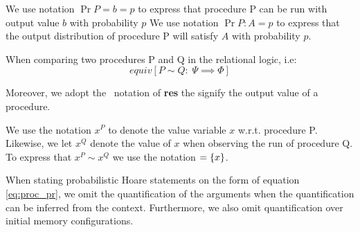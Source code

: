 We use notation $\Pr{P = b} = p$ to express that procedure P can be run with
output value $b$ with probability $p$
We use notation $\Pr{P : A} = p$ to express that the output distribution of
procedure P will satisfy $A$ with probability $p$.

When comparing two procedures P and Q in the relational logic, i.e:
\[
  equiv[P \sim Q :\; \Psi \implies \Phi]
\]

Moreover, we adopt the \easycrypt\ notation of \textbf{res} the signify the
output value of a procedure.

We use the notation $x^{P}$ to denote the value variable $x$ w.r.t. procedure P.
Likewise, we let $x^{Q}$ denote the value of $x$ when observing the run of
procedure Q. To express that $x^{P} \sim x^{Q}$ we use the notation $=\{x\}$.

When stating probabilistic Hoare statements on the form of equation
\ref{eq:proc_pr}, we omit the quantification of the arguments when the
quantification can be inferred from the context. Furthermore, we also omit
quantification over initial memory configurations.


